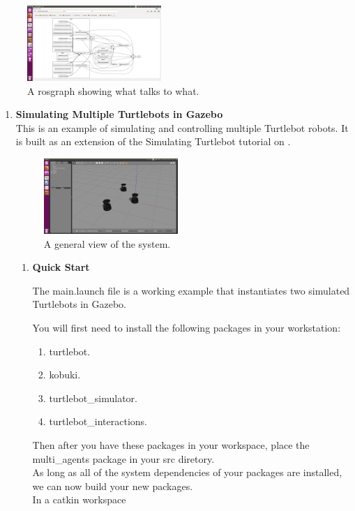 \documentclass[journal]{IEEEtran}
\begin{document}
\begin{figure}[!h]
\begin{center}
\includegraphics[width=2in]{4.png}
\caption{A rosgraph showing what talks to what.}
\end{center}
\label{fig2:mypicture2}
\end{figure}



\begin{enumerate}
\item \textbf {Simulating Multiple Turtlebots in Gazebo}\\
This is an example of simulating and controlling multiple Turtlebot robots. It is built as an extension of the Simulating Turtlebot tutorial on \cite{temp4}.

\begin{figure}[!h]
\begin{center}
\includegraphics[width=2in]{two.png}
\caption{A general view of the system.}
\end{center}
\label{fig:mypicture3}
\end{figure}

\begin{enumerate}
\item \textbf {Quick Start}

The main.launch file is a working example that instantiates two simulated Turtlebots in Gazebo. 

You will first need to install the following packages in your workstation:
\begin{enumerate}
\item {turtlebot}\cite{temp6}.
\item {kobuki}\cite{temp8}.
\item {turtlebot{\_}simulator}\cite{temp7}.
\item {turtlebot{\_}interactions}\cite{temp9}.
\end{enumerate}
Then after you have these packages in your workspace, place the multi{\_}agents\cite{temp5} package in your src diretory.\\
As long as all of the system dependencies of your packages are installed, we can now build your new packages.\\
In a catkin workspace


\end{enumerate}
\end{enumerate}
\end{document}
